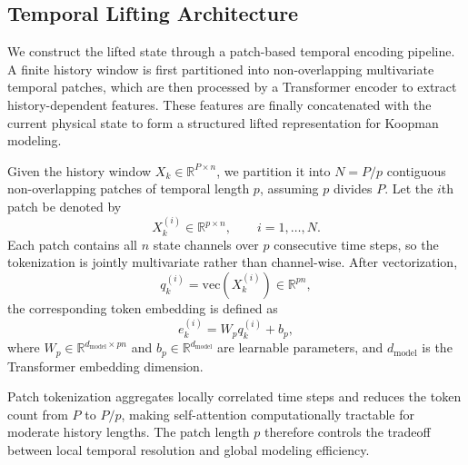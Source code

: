 \documentclass[journal]{IEEEtran}
\begin{document}
\subsection{Temporal Lifting Architecture}
\label{sec:temporal_lifting}

We construct the lifted state through a patch-based temporal encoding pipeline. A finite history window is first partitioned into non-overlapping multivariate temporal patches, which are then processed by a Transformer encoder to extract history-dependent features. These features are finally concatenated with the current physical state to form a structured lifted representation for Koopman modeling.

Given the history window $X_k \in \mathbb{R}^{P\times n}$, we partition it into $N=P/p$ contiguous non-overlapping patches of temporal length $p$, assuming $p$ divides $P$. Let the $i$th patch be denoted by
\begin{equation}
    X_k^{(i)} \in \mathbb{R}^{p\times n}, \qquad i=1,\ldots,N.
\end{equation}
Each patch contains all $n$ state channels over $p$ consecutive time steps, so the tokenization is jointly multivariate rather than channel-wise. After vectorization,
\begin{equation}
    q_k^{(i)} = \mathrm{vec}(X_k^{(i)}) \in \mathbb{R}^{pn},
\end{equation}
the corresponding token embedding is defined as
\begin{equation}
    e_k^{(i)} = W_p q_k^{(i)} + b_p,
    \label{eq:patch_embedding}
\end{equation}
where $W_p \in \mathbb{R}^{d_{\mathrm{model}}\times pn}$ and $b_p \in \mathbb{R}^{d_{\mathrm{model}}}$ are learnable parameters, and $d_{\mathrm{model}}$ is the Transformer embedding dimension.

Patch tokenization aggregates locally correlated time steps and reduces the token count from $P$ to $P/p$, making self-attention computationally tractable for moderate history lengths. The patch length $p$ therefore controls the tradeoff between local temporal resolution and global modeling efficiency.
\end{document}
